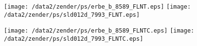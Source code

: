 \documentclass[twocolumn,final,11pt]{article}
\begin{document}
\begin{figure*}
\begin{center}
\texttt{[image: /data2/zender/ps/erbe\_b\_8589\_FLNT.eps]}\vfill
\vspace{.5in}
\texttt{[image: /data2/zender/ps/sld012d\_7993\_FLNT.eps]}\vfill
\end{center}
\end{figure*}
\clearpage

\begin{figure*}
\begin{center}
\texttt{[image: /data2/zender/ps/erbe\_b\_8589\_FLNTC.eps]}\vfill
\vspace{.5in}
\texttt{[image: /data2/zender/ps/sld012d\_7993\_FLNTC.eps]}\vfill
\end{center}
\end{figure*}
\clearpage

\end{document}

